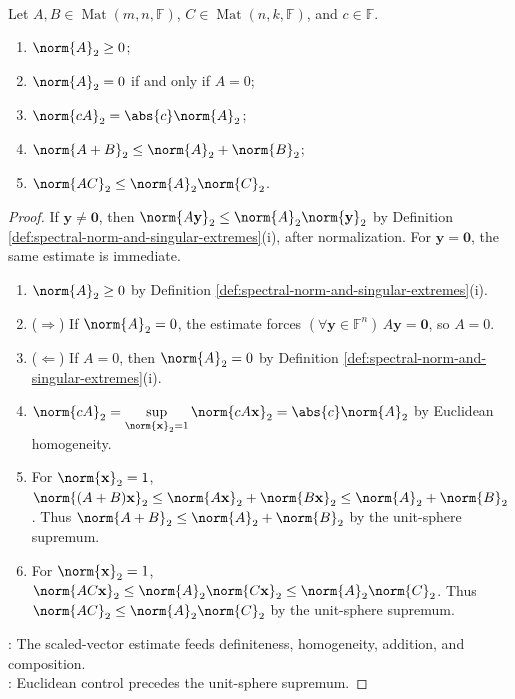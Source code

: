 \begin{proposition} \label{prop:spectral-norm-basic-properties} \\
Let $A,B\in\operatorname{Mat}(m,n,\mathbb{F})$, $C\in\operatorname{Mat}(n,k,\mathbb{F})$, and $c\in\mathbb{F}$.
\begin{enumerate}[label=(\roman*)]
\setlength{\itemsep}{0pt}
\item $\norm{A}_2\geq0$;
\item $\norm{A}_2=0$ if and only if $A=0$;
\item $\norm{cA}_2=\abs{c}\norm{A}_2$;
\item $\norm{A+B}_2\leq\norm{A}_2+\norm{B}_2$;
\item $\norm{AC}_2\leq\norm{A}_2\norm{C}_2$.
\end{enumerate}
\begin{proof}
If $\mathbf{y}\neq\mathbf{0}$, then $\norm{A\mathbf{y}}_2\leq\norm{A}_2\norm{\mathbf{y}}_2$ by Definition \ref{def:spectral-norm-and-singular-extremes}(i), after normalization. For $\mathbf{y}=\mathbf{0}$, the same estimate is immediate.
\begin{enumerate}[label=(\roman*)]
\setlength{\itemsep}{0pt}
\item[$(i)$] $\norm{A}_2\geq0$ by Definition \ref{def:spectral-norm-and-singular-extremes}(i).
\item[$(ii)$] ($\Rightarrow$) If $\norm{A}_2=0$, the estimate forces $(\forall\mathbf{y}\in\mathbb{F}^n)\,A\mathbf{y}=\mathbf{0}$, so $A=0$.
\item[$(ii)$] ($\Leftarrow$) If $A=0$, then $\norm{A}_2=0$ by Definition \ref{def:spectral-norm-and-singular-extremes}(i).
\item[$(iii)$] $\norm{cA}_2=\sup\limits_{\norm{\mathbf{x}}_2=1}\norm{cA\mathbf{x}}_2=\abs{c}\norm{A}_2$ by Euclidean homogeneity.
\item[$(iv)$] For $\norm{\mathbf{x}}_2=1$, $\norm{(A+B)\mathbf{x}}_2\leq\norm{A\mathbf{x}}_2+\norm{B\mathbf{x}}_2\leq\norm{A}_2+\norm{B}_2$. Thus $\norm{A+B}_2\leq\norm{A}_2+\norm{B}_2$ by the unit-sphere supremum.
\item[$(v)$] For $\norm{\mathbf{x}}_2=1$, $\norm{AC\mathbf{x}}_2\leq\norm{A}_2\norm{C\mathbf{x}}_2\leq\norm{A}_2\norm{C}_2$. Thus $\norm{AC}_2\leq\norm{A}_2\norm{C}_2$ by the unit-sphere supremum.
\end{enumerate}
: The scaled-vector estimate feeds definiteness, homogeneity, addition, and composition.\\
: Euclidean control precedes the unit-sphere supremum.
\end{proof}
\end{proposition}

